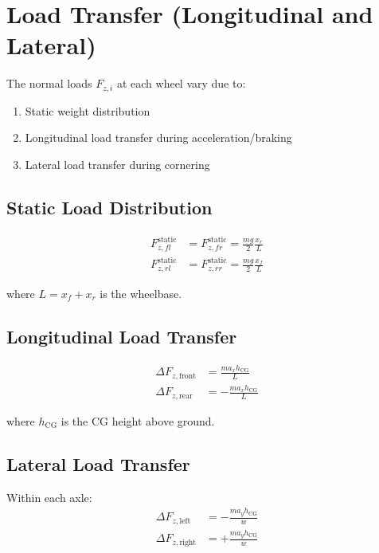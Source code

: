 \documentclass[11pt,a4paper]{article}
\begin{document}
\section{Load Transfer (Longitudinal and Lateral)}

The normal loads $F_{z,i}$ at each wheel vary due to:
\begin{enumerate}
    \item Static weight distribution
    \item Longitudinal load transfer during acceleration/braking
    \item Lateral load transfer during cornering
\end{enumerate}

\subsection{Static Load Distribution}

\begin{align}
F_{z,fl}^{\text{static}} &= F_{z,fr}^{\text{static}} = \frac{mg}{2} \frac{x_r}{L} \\
F_{z,rl}^{\text{static}} &= F_{z,rr}^{\text{static}} = \frac{mg}{2} \frac{x_f}{L}
\end{align}

where $L = x_f + x_r$ is the wheelbase.

\subsection{Longitudinal Load Transfer}

\begin{align}
\Delta F_{z,\text{front}} &= \frac{m a_x h_{\text{CG}}}{L} \\
\Delta F_{z,\text{rear}} &= -\frac{m a_x h_{\text{CG}}}{L}
\end{align}

where $h_{\text{CG}}$ is the CG height above ground.

\subsection{Lateral Load Transfer}

Within each axle:
\begin{align}
\Delta F_{z,\text{left}} &= -\frac{m a_y h_{\text{CG}}}{w} \\
\Delta F_{z,\text{right}} &= +\frac{m a_y h_{\text{CG}}}{w}
\end{align}
\end{document}
